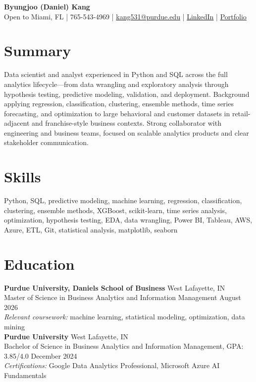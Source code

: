 \documentclass[11pt,a4paper]{article}
\begin{document}
\pagestyle{empty}

\begin{center}
    {\Huge \textbf{Byungjoo (Daniel) Kang}} \\[4pt]
    Open to Miami, FL | 765-543-4969 | \href{mailto:kang531@purdue.edu}{kang531@purdue.edu} |
    \href{https://www.linkedin.com/in/daniel-byungjoo-kang/}{LinkedIn} | \href{https://daniel-kang-vs.github.io}{Portfolio}
\end{center}

\section*{Summary}
Data scientist and analyst experienced in Python and SQL across the full analytics lifecycle---from data wrangling and exploratory analysis through hypothesis testing, predictive modeling, validation, and deployment. Background applying regression, classification, clustering, ensemble methods, time series forecasting, and optimization to large behavioral and customer datasets in retail-adjacent and franchise-style business contexts. Strong collaborator with engineering and business teams, focused on scalable analytics products and clear stakeholder communication.

\section*{Skills}
Python, SQL, predictive modeling, machine learning, regression, classification, clustering, ensemble methods, XGBoost, scikit-learn, time series analysis, optimization, hypothesis testing, EDA, data wrangling, Power BI, Tableau, AWS, Azure, ETL, Git, statistical analysis, matplotlib, seaborn

\section*{Education}
\noindent
\textbf{Purdue University, Daniels School of Business} \hfill West Lafayette, IN \\
Master of Science in Business Analytics and Information Management \hfill August 2026 \\
\textit{Relevant coursework:} machine learning, statistical modeling, optimization, data mining \\[6pt]
\textbf{Purdue University} \hfill West Lafayette, IN \\
Bachelor of Science in Business Analytics and Information Management, GPA: 3.85/4.0 \hfill December 2024 \\
\textit{Certifications:} Google Data Analytics Professional, Microsoft Azure AI Fundamentals
\end{document}
